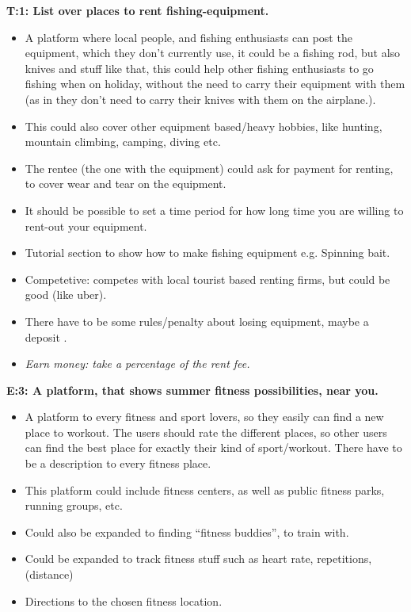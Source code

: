 \begin{multicols}{2}
\footnotesize{
{\noindent \textbf{T:1: List over places to rent fishing-equipment.}}
\begin{itemize}
	\item A platform where local people, and fishing enthusiasts can post the equipment, which they don’t currently use, it could be a fishing rod, but also knives and stuff like that, this could help other fishing enthusiasts to go fishing when on holiday, without the need to carry their equipment with them (as in they don’t need to carry their knives with them on the airplane.). 
	\item This could also cover other equipment based/heavy hobbies, like hunting, mountain climbing, camping, diving etc.
	\item The rentee (the one with the equipment) could ask for payment for renting, to cover wear and tear on the equipment.
	\item It should be possible to set a time period for how long time you are willing to rent-out your equipment. 
	\item Tutorial section to show how to make fishing equipment e.g. Spinning bait.
	\item Competetive: competes with local tourist based renting firms, but could be good (like uber).
	\item There have to be some rules/penalty about losing equipment, maybe a deposit .
	\item \textit{Earn money: take a percentage of the rent fee. }
\end{itemize}
\vspace{2em}
{\noindent \textbf{E:3: A platform, that shows summer fitness possibilities, near you.}}
\begin{itemize}
	\item A platform to every fitness and sport lovers, so they easily can find a new place to workout. The users should rate the different places, so other users can find the best place for exactly their kind of sport/workout. There have to be a description to every fitness place.  
	\item This platform could include fitness centers, as well as public fitness parks, running groups, etc.
	\item Could also be expanded to finding “fitness buddies”, to train with.
	\item Could be expanded to track fitness stuff such as heart rate, repetitions, (distance) 
	\item Directions to the chosen fitness location.

\end{itemize}}
\end{multicols}
